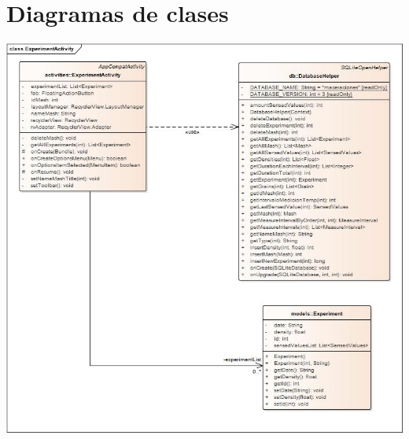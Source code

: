     \begin{minipage}{0.95\textwidth}
    \chapter{Diagramas de clases}
        \centering
        \includegraphics[scale=0.55, angle=90]{Anexo/DiagramasClase/ExperimentActivity.jpg}
        \label{fig:DiagClaseExperimentActivity}
    \end{minipage}
    
